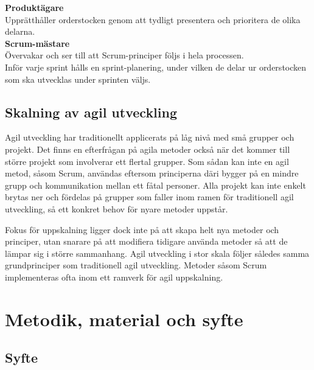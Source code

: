 		\textbf{Produktägare} \\
		Upprätthåller orderstocken genom att tydligt presentera och prioritera de olika delarna. \\
		
		\textbf{Scrum-mästare} \\
		Övervakar och ser till att Scrum-principer följs i hela processen. \\
		
		Inför varje sprint hålls en sprint-planering, under vilken de delar ur orderstocken som ska utvecklas under sprinten väljs.
			
		\cite{scrum_guide}
		

	\subsection{Skalning av agil utveckling}
		
		Agil utveckling har traditionellt applicerats på låg nivå med små grupper och projekt. Det finns en efterfrågan på agila metoder också när det kommer till större projekt som involverar ett flertal grupper. Som sådan kan inte en agil metod, såsom Scrum, användas eftersom principerna däri bygger på en mindre grupp och kommunikation mellan ett fåtal personer.
		Alla projekt kan inte enkelt brytas ner och fördelas på grupper som faller inom ramen för traditionell agil utveckling, så ett konkret behov för nyare metoder uppstår.
		
		Fokus för uppskalning ligger dock inte på att skapa helt nya metoder och principer, utan snarare på att modifiera tidigare använda metoder så att de lämpar sig i större sammanhang. Agil utveckling i stor skala följer således samma grundprinciper som traditionell agil utveckling. Metoder såsom Scrum implementeras ofta inom ett ramverk för agil uppskalning.

		
	\newpage

\section{Metodik, material och syfte}
	
	
	\subsection{Syfte}
	
